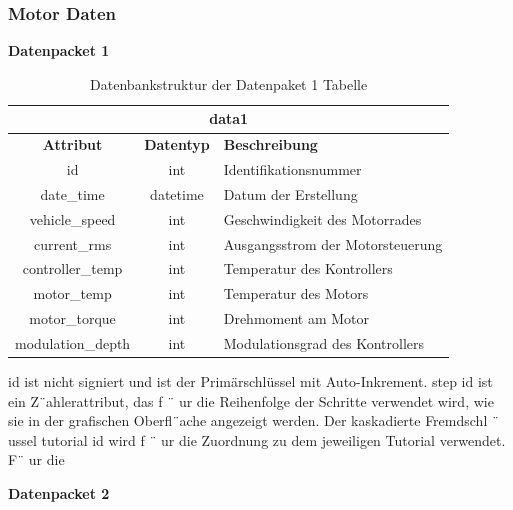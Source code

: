 \subsubsection{Motor Daten}

\textbf{Datenpacket 1}
 
\begin{table}[H]
	\begin{center}
		\begin{tabular}{|c|c|l|}
			\hline
			\multicolumn{3}{|c|}{\textbf{data1}} \\ \hline
			\textbf{Attribut} & \textbf{Datentyp} & \textbf{Beschreibung}            \\ \hline
			id                & int               & Identifikationsnummer            \\ \hline
			date\_time        & datetime          & Datum der Erstellung             \\ \hline
			vehicle\_speed    & int               & Geschwindigkeit des Motorrades   \\ \hline
			current\_rms      & int               & Ausgangsstrom der Motorsteuerung \\ \hline
			controller\_temp  & int               & Temperatur des Kontrollers       \\ \hline
			motor\_temp       & int               & Temperatur des Motors            \\ \hline
			motor\_torque     & int               & Drehmoment am Motor              \\ \hline
			modulation\_depth & int               & Modulationsgrad des Kontrollers  \\ \hline
		\end{tabular}
			\caption{Datenbankstruktur der Datenpaket 1 Tabelle}
			\label{tab:data1}
	\end{center}
\end{table}

id ist nicht signiert und ist der Primärschlüssel mit Auto-Inkrement.
step id ist ein Z¨ahlerattribut, das f ¨ ur die Reihenfolge der Schritte verwendet wird, wie
sie in der grafischen Oberfl¨ache angezeigt werden. Der kaskadierte Fremdschl ¨ ussel
tutorial id wird f ¨ ur die Zuordnung zu dem jeweiligen Tutorial verwendet. F¨ ur die

\newpage

\textbf{Datenpacket 2}

